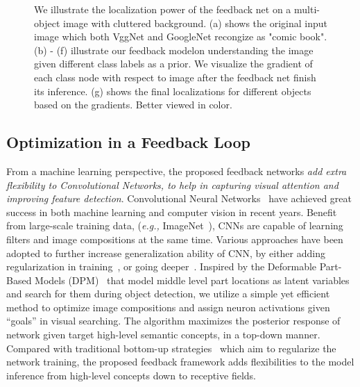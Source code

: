 \begin{figure}[htb]
\begin{center}
\begin{tabular}{ccccccc}
\end{tabular}
\caption{We illustrate the localization power of the feedback net on a multi-object image with cluttered background. (a) shows the original input image which both VggNet and GoogleNet recongize as "comic book". (b) - (f) illustrate our feedback modelon understanding the image given different class labels as a prior. We visualize the gradient of each class node with respect to image after the feedback net finish its inference. (g) shows the final localizations for different objects based on the gradients. Better viewed in color.}
\label{fig:splah}
\end{center}
\end{figure}

\subsection{Optimization in a Feedback Loop}
From a machine learning perspective, the proposed feedback networks \emph{add extra flexibility to Convolutional Networks, to help in capturing visual attention and improving feature detection}. Convolutional Neural Networks~\cite{lecun1998gradient, Krizhevsky2012ImageNet, Simonyan2014Very} have achieved great success in both machine learning and computer vision in recent years. Benefit from large-scale training data, (\emph{e.g.,} ImageNet~\cite{deng2009imagenet}), CNNs are capable of learning filters and image compositions at the same time. Various approaches have been adopted to further increase generalization ability of CNN, by either adding regularization in training~\cite{he2015delving,ioffe2015batch}, or going deeper~\cite{Simonyan2014Very, Szegedy2014Going}. Inspired by the Deformable Part-Based Models (DPM)~\cite{Felzenszwalb2010Object} that model middle level part locations as latent variables and search for them during object detection, we utilize a simple yet efficient method to optimize image compositions and assign neuron activations given ``goals'' in visual searching. The algorithm maximizes the posterior response of network given target high-level semantic concepts, in a top-down manner. Compared with traditional bottom-up strategies~\cite{he2015delving, ioffe2015batch} which aim to regularize the network training, the proposed feedback framework adds flexibilities to the model inference from high-level concepts down to receptive fields.

